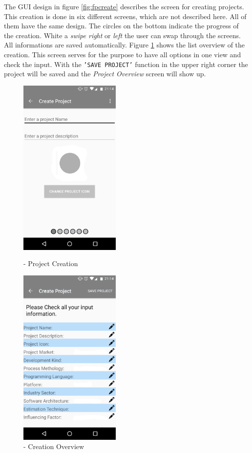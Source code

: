 The GUI design in figure \ref{fig:fpcreate} describes the screen for creating projects. This creation is done in six different screens, which are not described here. All of them have the same design. The circles on the bottom indicate the progress of the creation. White a \textit{swipe right} or \textit{left} the user can swap through the screens. All informations are saved automatically. Figure \ref{fig:fpcreateOverview} shows the list overview of the creation. This screen serves for the purpose to have all options in one view and check the input. With the \texttt{'SAVE PROJECT'} function in the upper right corner the project will be saved and the \textit{Project Overview} screen will show up.
\begin{figure}[htb]
	\centering
	\begin{minipage}[t]{0.45\linewidth}
		\centering 
		\includegraphics[width=5cm]{images/ProjectCreation.png} 
		\caption{- Project Creation} 
		\label{fig:fpcreate}
	\end{minipage}%
	\hfill
	\begin{minipage}[t]{0.45\linewidth}
		\centering 
		\includegraphics[width=5cm]{images/CreationOverview.png} 
		\caption{- Creation Overview} 
		\label{fig:fpcreateOverview}
	\end{minipage}
\end{figure}

